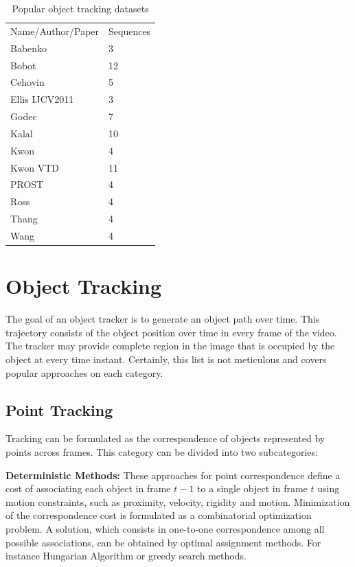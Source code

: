 \begin{table}[h!]
\centering
\begin{tabular}{|ll|}
\hline
Name/Author/Paper & Sequences \\
Babenko           & 3         \\
Bobot             & 12        \\
Cehovin           & 5         \\
Ellis IJCV2011    & 3         \\
Godec             & 7         \\
Kalal             & 10        \\
Kwon              & 4         \\
Kwon VTD          & 11        \\
PROST             & 4         \\
Ross              & 4         \\
Thang             & 4         \\
Wang              & 4         \\
\hline
\end{tabular}
\caption{Popular object tracking datasets}
\label{table:datasets}
\end{table}

\section{Object Tracking}

The goal of an object tracker is to generate an object path over time. This trajectory consists of the object position over time in every frame of the video. The tracker may provide complete region in the image that is occupied by the object at every time instant. Certainly, this list is not meticulous and covers popular approaches on each category.

\subsection{Point Tracking}

Tracking can be formulated as the correspondence of objects represented by points across frames. This category can be divided into two subcategories:

\textbf{Deterministic Methods: } These approaches for point correspondence define a cost of associating each object in frame $t-1$ to a single object in frame $t$ using motion constraints, such as proximity, velocity, rigidity and motion. Minimization of the correspondence cost is formulated as a combinatorial optimization problem. A solution, which consists in one-to-one correspondence among all possible associations, can be obtained by optimal assignment methods. For instance Hungarian Algorithm \cite{Qin2012} or greedy search methods.


